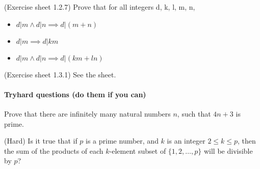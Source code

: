 \documentclass{exam}
\begin{document}
\begin{questions}
\question (Exercise sheet 1.2.7) Prove that for all integers d, k, l, m, n,
\begin{itemize}
\item $d | m \wedge d | n \implies d | (m + n)$
\item $ d | m \implies d | k m$
\item $ d | m \wedge d | n \implies d | (k m + l n)$
\end{itemize} 

\question (Exercise sheet 1.3.1) See the sheet.

\end{questions}

\paragraph{Tryhard questions (do them if you can)}
\begin{questions}

\question Prove that there are infinitely many natural numbers $n$, such that $4n+3$ is prime.

\question (Hard) Is it true that if $p$ is a prime number, and $k$ is an integer $2 \le k \le p$, then the sum of the products of each $k$-element subset of $\{1, 2, \ldots, p\}$ will be divisible by $p$? 
\end{questions}
\end{document}

